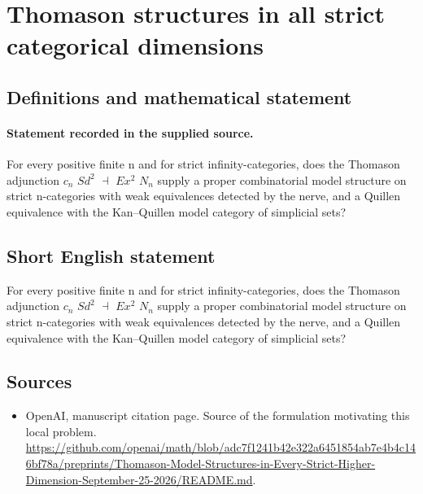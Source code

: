 \documentclass[11pt]{article}
\begin{document}
\section*{Thomason structures in all strict categorical dimensions}\label{statement}
\subsection{Definitions and mathematical statement}
\paragraph{Statement recorded in the supplied source.}
For every positive finite n and for strict infinity-categories, does the Thomason adjunction $c_n$ $Sd^{2}$ $\dashv $ $Ex^{2}$ $N_n$ supply a proper combinatorial model structure on strict n-categories with weak equivalences detected by the nerve, and a Quillen equivalence with the Kan–Quillen model category of simplicial sets?
\subsection{Short English statement}
For every positive finite n and for strict infinity-categories, does the Thomason adjunction $c_n$ $Sd^{2}$ $\dashv $ $Ex^{2}$ $N_n$ supply a proper combinatorial model structure on strict n-categories with weak equivalences detected by the nerve, and a Quillen equivalence with the Kan–Quillen model category of simplicial sets?
\subsection{Sources}
\begin{itemize}
\item[S1] OpenAI, manuscript citation page. Source of the formulation motivating this local problem.
\url{https://github.com/openai/math/blob/adc7f1241b42e322a6451854ab7e4b4c146bf78a/preprints/Thomason-Model-Structures-in-Every-Strict-Higher-Dimension-September-25-2026/README.md}.
\end{itemize}
\end{document}
